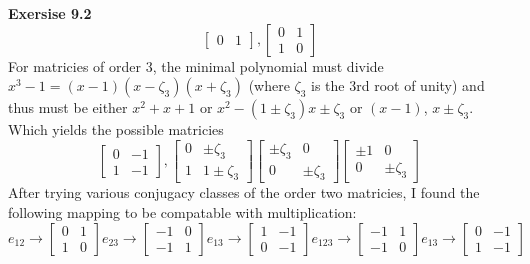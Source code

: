 \documentclass[12pt]{article}
\newenvironment{ques}[1]{\textbf{Exersise #1}\vspace{1 mm}\\ }{\bigskip}
\theoremstyle{definition}
\begin{document}
\begin{ques}{9.2}
$$\begin{bmatrix}
		0 &  1
	\end{bmatrix},
	\begin{bmatrix}
		0 & 1 \\
		1 & 0
	\end{bmatrix}
	$$
	For matricies of order $3$, the minimal polynomial must divide $x^3 - 1
	= (x-1)(x-\zeta_3)(x+\zeta_3)$ (where $\zeta_3$ is the 3rd root of unity)
	and thus must be either $x^2 + x+1$ or $x^2 - (1\pm \zeta_3)x \pm \zeta_3$
	or $(x -1)$, $x\pm \zeta_3$. Which yields the possible matricies
	$$
	\begin{bmatrix}
		0 & -1 \\
		1 & -1
	\end{bmatrix},
	\begin{bmatrix}
		0 & \pm \zeta_3 \\
		1 & 1 \pm \zeta_3
	\end{bmatrix}
	\begin{bmatrix}
		\pm \zeta_3 & 0 \\
		0 & \pm \zeta_3
	\end{bmatrix}
	\begin{bmatrix}
		\pm 1 & 0 \\
		0 & \pm \zeta_3
	\end{bmatrix}
	$$
	After trying various conjugacy classes of the order two matricies, I found
	the following mapping to be compatable with multiplication:
	$$
	e_{12} \to \begin{bmatrix}
		0 & 1 \\
		1 & 0
	\end{bmatrix}
	e_{23} \to \begin{bmatrix}
		-1 & 0 \\
		-1 & 1
	\end{bmatrix}
	e_{13} \to \begin{bmatrix}
		1 & -1 \\
		0 & -1
	\end{bmatrix}
	e_{123} \to \begin{bmatrix}
		-1 & 1 \\
		-1 & 0
	\end{bmatrix}
	e_{13} \to \begin{bmatrix}
		0 & -1 \\
		1 & -1
	\end{bmatrix}
	$$
\end{ques}
\end{document}
